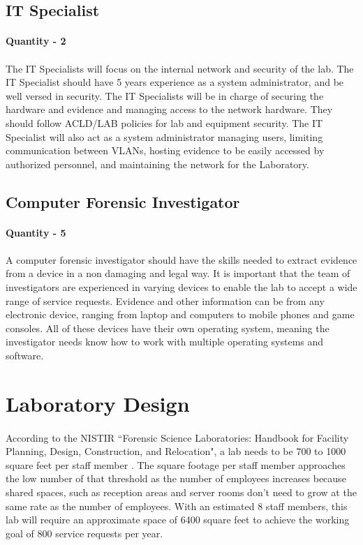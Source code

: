 \documentclass[12pt]{article}
\begin{document}
\subsection{IT Specialist}
\paragraph{Quantity - 2}
\paragraph{}
The IT Specialists will focus on the internal network and security of the lab.
The IT Specialist should have 5 years experience as a system administrator, and be well versed in security.
The IT Specialists will be in charge of securing the hardware and evidence and managing access to the network hardware.
They should follow ACLD/LAB policies for lab and equipment security.
The IT Specialist will also act as a system administrator managing users, limiting communication between VLANs, hosting evidence to be easily accessed by authorized personnel, and maintaining the network for the Laboratory.

\subsection{Computer Forensic Investigator}
\paragraph{Quantity - 5}
\paragraph{}
A computer forensic investigator should have the skills needed to extract evidence from a device in a non damaging and legal way.
It is important that the team of investigators are experienced in varying devices to enable the lab to accept a wide range of service requests.
Evidence and other information can be from any electronic device, ranging from laptop and computers to mobile phones and game consoles.
All of these devices have their own operating system, meaning the investigator needs know how to work with multiple operating systems and software.

\section{Laboratory Design}
\paragraph{} According to the NISTIR ``Forensic Science Laboratories: Handbook for Facility Planning, Design, Construction, and Relocation", a lab needs to be 700 to 1000 square feet per staff member \cite{pdf}.
The square footage per staff member approaches the low number of that threshold as the number of employees increases because shared spaces, such as reception areas and server rooms don't need to grow at the same rate as the number of employees.
With an estimated 8 staff members, this lab will require an approximate space of 6400 square feet to achieve the working goal of 800 service requests per year.
\end{document}

